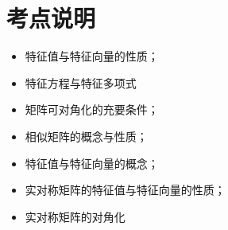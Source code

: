 \section{考点说明}
\begin{itemize}
\item 特征值与特征向量的性质；
\item 特征方程与特征多项式
\item 矩阵可对角化的充要条件；
\item 相似矩阵的概念与性质；
\item 特征值与特征向量的概念；
\item 实对称矩阵的特征值与特征向量的性质；
\item 实对称矩阵的对角化
\end{itemize}

